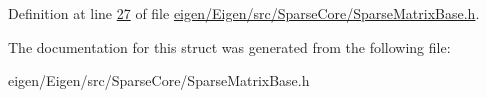 Definition at line \hyperlink{eigen_2_eigen_2src_2_sparse_core_2_sparse_matrix_base_8h_source_l00027}{27} of file \hyperlink{eigen_2_eigen_2src_2_sparse_core_2_sparse_matrix_base_8h_source}{eigen/\+Eigen/src/\+Sparse\+Core/\+Sparse\+Matrix\+Base.\+h}.



The documentation for this struct was generated from the following file\+:\begin{DoxyCompactItemize}
\item 
eigen/\+Eigen/src/\+Sparse\+Core/\+Sparse\+Matrix\+Base.\+h\end{DoxyCompactItemize}
